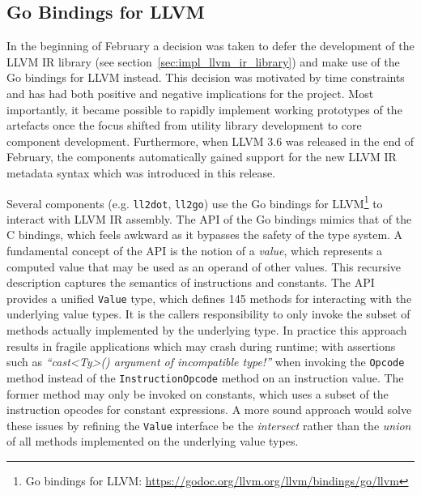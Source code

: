 
\subsection{Go Bindings for LLVM}
\label{sec:impl_go_bindings_for_llvm}

In the beginning of February a decision was taken to defer the development of the LLVM IR library (see section~\ref{sec:impl_llvm_ir_library}) and make use of the Go bindings for LLVM instead. This decision was motivated by time constraints and has had both positive and negative implications for the project. Most importantly, it became possible to rapidly implement working prototypes of the artefacts once the focus shifted from utility library development to core component development. Furthermore, when LLVM 3.6 was released in the end of February, the components automatically gained support for the new LLVM IR metadata syntax which was introduced in this release.

Several components (e.g. \texttt{ll2dot}, \texttt{ll2go}) use the Go bindings for LLVM\footnote{Go bindings for LLVM: \url{https://godoc.org/llvm.org/llvm/bindings/go/llvm}} to interact with LLVM IR assembly. The API of the Go bindings mimics that of the C bindings, which feels awkward as it bypasses the safety of the type system. A fundamental concept of the API is the notion of a \textit{value}, which represents a computed value that may be used as an operand of other values. This recursive description captures the semantics of instructions and constants. The API provides a unified \texttt{Value} type, which defines 145 methods for interacting with the underlying value types. It is the callers responsibility to only invoke the subset of methods actually implemented by the underlying type. In practice this approach results in fragile applications which may crash during runtime; with assertions such as \textit{``cast<Ty>() argument of incompatible type!''} when invoking the \texttt{Opcode} method instead of the \texttt{InstructionOpcode} method on an instruction value. The former method may only be invoked on constants, which uses a subset of the instruction opcodes for constant expressions. A more sound approach would solve these issues by refining the \texttt{Value} interface be the \textit{intersect} rather than the \textit{union} of all methods implemented on the underlying value types.

